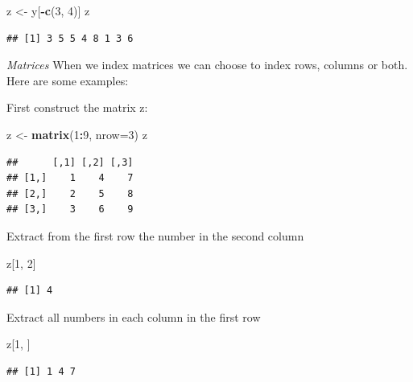 \documentclass[]{book}
\newenvironment{Shaded}{\begin{snugshade}}{\end{snugshade}}
\newcommand{\KeywordTok}[1]{\textcolor[rgb]{0.13,0.29,0.53}{\textbf{#1}}}
\newcommand{\DataTypeTok}[1]{\textcolor[rgb]{0.13,0.29,0.53}{#1}}
\newcommand{\DecValTok}[1]{\textcolor[rgb]{0.00,0.00,0.81}{#1}}
\newcommand{\StringTok}[1]{\textcolor[rgb]{0.31,0.60,0.02}{#1}}
\newcommand{\OperatorTok}[1]{\textcolor[rgb]{0.81,0.36,0.00}{\textbf{#1}}}
\newcommand{\NormalTok}[1]{#1}
\theoremstyle{definition}
\theoremstyle{definition}
\theoremstyle{definition}
\theoremstyle{remark}
\begin{document}
\begin{Shaded}
\begin{Highlighting}[]
\NormalTok{z <-}\StringTok{ }\NormalTok{y[}\OperatorTok{-}\KeywordTok{c}\NormalTok{(}\DecValTok{3}\NormalTok{, }\DecValTok{4}\NormalTok{)]}
\NormalTok{z}
\end{Highlighting}
\end{Shaded}

\begin{verbatim}
## [1] 3 5 5 4 8 1 3 6
\end{verbatim}

\emph{Matrices} When we index matrices we can choose to index rows,
columns or both. Here are some examples:

First construct the matrix z:

\begin{Shaded}
\begin{Highlighting}[]
\NormalTok{z <-}\StringTok{ }\KeywordTok{matrix}\NormalTok{(}\DecValTok{1}\OperatorTok{:}\DecValTok{9}\NormalTok{, }\DataTypeTok{nrow=}\DecValTok{3}\NormalTok{)}
\NormalTok{z}
\end{Highlighting}
\end{Shaded}

\begin{verbatim}
##      [,1] [,2] [,3]
## [1,]    1    4    7
## [2,]    2    5    8
## [3,]    3    6    9
\end{verbatim}

Extract from the first row the number in the second column

\begin{Shaded}
\begin{Highlighting}[]
\NormalTok{z[}\DecValTok{1}\NormalTok{, }\DecValTok{2}\NormalTok{]}
\end{Highlighting}
\end{Shaded}

\begin{verbatim}
## [1] 4
\end{verbatim}

Extract all numbers in each column in the first row

\begin{Shaded}
\begin{Highlighting}[]
\NormalTok{z[}\DecValTok{1}\NormalTok{, ]}
\end{Highlighting}
\end{Shaded}

\begin{verbatim}
## [1] 1 4 7
\end{verbatim}
\end{document}
